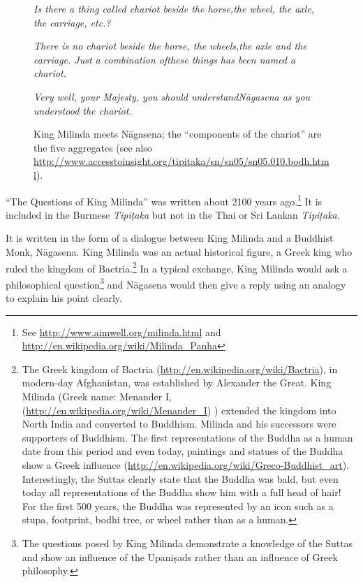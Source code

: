 \begin{figure}[H]
\begin{quoting}
\begin{flushright}
\vspace{-1mm}
\textit{Is there a thing called chariot beside the horse,\linebreak the wheel, the axle, the carriage, etc.?}
\vspace{-1mm}
\end{flushright}
\begin{flushleft}
\vspace{-1mm}
\textit{There is no chariot beside the horse, the wheels,\linebreak the axle and the carriage. Just a combination of\linebreak these things has been named a chariot.}
\vspace{-1mm}
\end{flushleft}
\begin{flushright}
\vspace{-1mm}
\textit{Very well, your Majesty, you should understand\linebreak Nāgasena as you understood the chariot.}
\vspace{-1mm}
\end{flushright}
\end{quoting}

\caption{King Milinda meets Nāgasena; the “components of the chariot” are the five aggregates (see also \url{http://www.accesstoinsight.org/tipitaka/sn/sn05/sn05.010.bodh.html}). }
\label{fig:Milinda}
\end{figure}

“The Questions of King Milinda” was written about 2100 years ago.\footnote{See \url{http://www.aimwell.org/milinda.html} and \url{http://en.wikipedia.org/wiki/Milinda_Panha}} It is included in the Burmese \textit{Tipiṭaka} but not in the Thai or Sri Lankan \textit{Tipiṭaka}.

It is written in the form of a dialogue between King Milinda and a Buddhist Monk, Nāgasena. King Milinda was an actual historical figure, a Greek king who ruled the kingdom of Bactria.\footnote{The Greek kingdom of Bactria (\url{http://en.wikipedia.org/wiki/Bactria}), in modern-day Afghanistan, was established by Alexander the Great. King Milinda (Greek name: Menander I, (\url{http://en.wikipedia.org/wiki/Menander_I}) ) extended the kingdom into North India and converted to Buddhism. Milinda and his successors were supporters of Buddhism. The first representations of the Buddha as a human date from this period and even today, paintings and statues of the Buddha show a Greek influence (\url{http://en.wikipedia.org/wiki/Greco-Buddhist_art}). Interestingly, the Suttas clearly state that the Buddha was bald, but even today all representations of the Buddha show him with a full head of hair! For the first 500 years, the Buddha was represented by an icon such as a stupa, footprint, bodhi tree, or wheel rather than as a human.} In a typical exchange, King Milinda would ask a philosophical question\footnote{The questions posed by King Milinda demonstrate a knowledge of the Suttas and show an influence of the Upaniṣads rather than an influence of Greek philosophy.} and Nāgasena would then give a reply using an analogy to explain his point clearly. 

